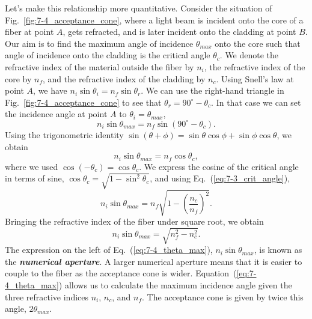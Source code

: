 Let's make this relationship more quantitative.
Consider the situation of Fig.~\ref{fig:7-4_acceptance_cone}, where a light beam is incident onto the core of a fiber at point $A$, gets refracted, and is later incident onto the cladding at point $B$.
Our aim is to find the maximum angle of incidence $\theta_{max}$ onto the core such that angle of incidence onto the cladding is the critical angle $\theta_c$.
We denote the refractive index of the material outside the fiber by $n_i$, the refractive index of the core by $n_f$, and the refractive index of the cladding by $n_c$.
Using Snell's law at point $A$, we have $n_i \sin \theta_i = n_f \sin \theta_r$.
We can use the right-hand triangle in Fig.~\ref{fig:7-4_acceptance_cone} to see that $\theta_r = 90^{\circ} - \theta_c$.
In that case we can set the incidence angle at point $A$ to $\theta_i = \theta_{max}$,
\begin{equation}
    n_i \sin \theta_{max} = n_f \sin (90^{\circ} - \theta_c).
\end{equation}
Using the trigonometric identity $\sin(\theta + \phi) = \sin\theta\cos\phi + \sin\phi\cos\theta$, we obtain
\begin{equation}
    n_i \sin \theta_{max} = n_f \cos\theta_c,
\end{equation}
where we used $\cos(-\theta_c) = \cos\theta_c$.
We express the cosine of the critical angle in terms of sine, $\cos\theta_c = \sqrt{1 - \sin^2\theta_c}$, and using Eq.~(\ref{eq:7-3_crit_angle}),
\begin{equation}
    n_i \sin \theta_{max} = n_f \sqrt{1 - \left( \frac{n_c}{n_f} \right)^2}.
\end{equation}
Bringing the refractive index of the fiber under square root, we obtain
\begin{equation}
    n_i \sin \theta_{max} = \sqrt{n_f^2 -  n_c^2}.
    \label{eq:7-4_theta_max}
\end{equation}
The expression on the left of Eq.~(\ref{eq:7-4_theta_max}), $n_i \sin \theta_{max}$, is known as the \textbf{\emph{numerical aperture}}.
A larger numerical aperture means that it is easier to couple to the fiber as the acceptance cone is wider.
Equation~(\ref{eq:7-4_theta_max}) allows us to calculate the maximum incidence angle given the three refractive indices $n_i$, $n_c$, and $n_f$.
The acceptance cone is given by twice this angle, $2 \theta_{max}$.

